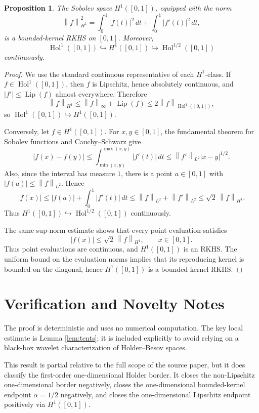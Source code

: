 \documentclass[11pt]{article}
\newtheorem{proposition}{Proposition}
\newcommand{\Hol}{\operatorname{Hol}}
\newcommand{\norm}[1]{\left\lVert #1\right\rVert}
\newcommand{\abs}[1]{\left\lvert #1\right\rvert}
\begin{document}
\begin{proposition}\label{prop:h1-endpoint}
The Sobolev space \(H^1([0,1])\), equipped with the norm
\[
  \norm{f}_{H^1}^2=\int_0^1 \abs{f(t)}^2\,dt+
  \int_0^1 \abs{f'(t)}^2\,dt,
\]
is a bounded-kernel RKHS on \([0,1]\). Moreover,
\[
  \Hol^1([0,1])\hookrightarrow H^1([0,1])
  \hookrightarrow \Hol^{1/2}([0,1])
\]
continuously.
\end{proposition}

\begin{proof}
We use the standard continuous representative of each \(H^1\)-class. If
\(f\in\Hol^1([0,1])\), then \(f\) is Lipschitz, hence absolutely continuous,
and \(\abs{f'}\leq \operatorname{Lip}(f)\) almost everywhere. Therefore
\[
  \norm{f}_{H^1}
  \leq \norm{f}_\infty+\operatorname{Lip}(f)
  \leq 2\norm{f}_{\Hol^1([0,1])},
\]
so \(\Hol^1([0,1])\hookrightarrow H^1([0,1])\).

Conversely, let \(f\in H^1([0,1])\). For \(x,y\in[0,1]\), the fundamental
theorem for Sobolev functions and Cauchy--Schwarz give
\[
  \abs{f(x)-f(y)}
  \leq \int_{\min(x,y)}^{\max(x,y)}\abs{f'(t)}\,dt
  \leq \norm{f'}_{L^2}\abs{x-y}^{1/2}.
\]
Also, since the interval has measure \(1\), there is a point \(a\in[0,1]\)
with \(\abs{f(a)}\leq\norm{f}_{L^2}\). Hence
\[
  \abs{f(x)}
  \leq \abs{f(a)}+\int_0^1\abs{f'(t)}\,dt
  \leq \norm{f}_{L^2}+\norm{f'}_{L^2}
  \leq \sqrt2\,\norm{f}_{H^1}.
\]
Thus \(H^1([0,1])\hookrightarrow\Hol^{1/2}([0,1])\) continuously.

The same sup-norm estimate shows that every point evaluation satisfies
\[
  \abs{f(x)}\leq\sqrt2\,\norm{f}_{H^1},\qquad x\in[0,1].
\]
Thus point evaluations are continuous, and \(H^1([0,1])\) is an RKHS. The
uniform bound on the evaluation norms implies that its reproducing kernel is
bounded on the diagonal, hence \(H^1([0,1])\) is a bounded-kernel RKHS.
\end{proof}

\section*{Verification and Novelty Notes}

The proof is deterministic and uses no numerical computation. The key local
estimate is Lemma \ref{lem:tents}; it is included explicitly to avoid relying
on a black-box wavelet characterization of Holder--Besov spaces.

This result is partial relative to the full scope of the source paper, but it
does classify the first-order one-dimensional Holder border. It closes the
non-Lipschitz one-dimensional border negatively, closes the
one-dimensional bounded-kernel endpoint \(\alpha=1/2\) negatively, and closes
the one-dimensional Lipschitz endpoint positively via \(H^1([0,1])\).
\end{document}

